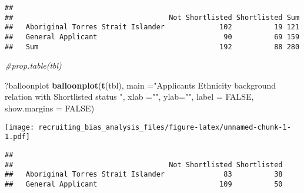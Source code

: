 \documentclass[]{article}
\newenvironment{Shaded}{\begin{snugshade}}{\end{snugshade}}
\newcommand{\KeywordTok}[1]{\textcolor[rgb]{0.13,0.29,0.53}{\textbf{#1}}}
\newcommand{\DataTypeTok}[1]{\textcolor[rgb]{0.13,0.29,0.53}{#1}}
\newcommand{\DecValTok}[1]{\textcolor[rgb]{0.00,0.00,0.81}{#1}}
\newcommand{\FloatTok}[1]{\textcolor[rgb]{0.00,0.00,0.81}{#1}}
\newcommand{\StringTok}[1]{\textcolor[rgb]{0.31,0.60,0.02}{#1}}
\newcommand{\CommentTok}[1]{\textcolor[rgb]{0.56,0.35,0.01}{\textit{#1}}}
\newcommand{\OtherTok}[1]{\textcolor[rgb]{0.56,0.35,0.01}{#1}}
\newcommand{\OperatorTok}[1]{\textcolor[rgb]{0.81,0.36,0.00}{\textbf{#1}}}
\newcommand{\NormalTok}[1]{#1}
\begin{document}
\begin{verbatim}
##                                    
##                                     Not Shortlisted Shortlisted Sum
##   Aboriginal Torres Strait Islander             102          19 121
##   General Applicant                              90          69 159
##   Sum                                           192          88 280
\end{verbatim}

\begin{Shaded}
\begin{Highlighting}[]
\CommentTok{#prop.table(tbl)}

\NormalTok{?balloonplot}
\KeywordTok{balloonplot}\NormalTok{(}\KeywordTok{t}\NormalTok{(tbl), }\DataTypeTok{main =}\StringTok{"Applicants Ethnicity background relation with Shortlisted status "}\NormalTok{, }\DataTypeTok{xlab =}\StringTok{""}\NormalTok{, }\DataTypeTok{ylab=}\StringTok{""}\NormalTok{,}
            \DataTypeTok{label =} \OtherTok{FALSE}\NormalTok{, }\DataTypeTok{show.margins =} \OtherTok{FALSE}\NormalTok{)}
\end{Highlighting}
\end{Shaded}

\texttt{[image: recruiting\_bias\_analysis\_files/figure-latex/unnamed-chunk-1-1.pdf]}

\begin{Shaded}
\end{Shaded}

\begin{verbatim}
##                                    
##                                     Not Shortlisted Shortlisted
##   Aboriginal Torres Strait Islander              83          38
##   General Applicant                             109          50
\end{verbatim}
\end{document}
